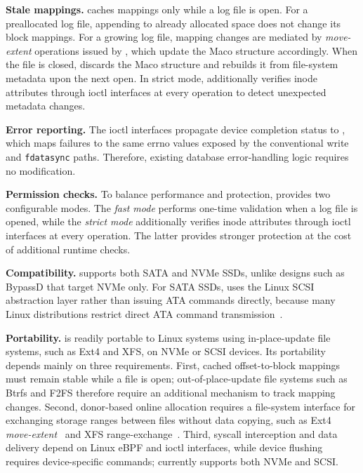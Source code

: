 \textbf{Stale mappings.}
\odes caches mappings only while a log file is open. For a preallocated log
file, appending to already allocated space does not change its block
mappings. For a growing log file, mapping changes are mediated by
\emph{move-extent} operations issued by \odes, which update the Maco
structure accordingly. When the file is closed, \odes discards the Maco
structure and rebuilds it from file-system metadata upon the next open.
In strict mode, \odes additionally verifies inode attributes through ioctl
interfaces at every operation to detect unexpected metadata changes.

\textbf{Error reporting.}
The ioctl interfaces propagate device completion status to \odes, which maps
failures to the same errno values exposed by the conventional write and
\texttt{fdatasync} paths. Therefore, existing database error-handling logic
requires no modification.

\textbf{Permission checks.}
To balance performance and protection, \odes provides two configurable
modes. The \emph{fast mode} performs one-time validation when a log file is
opened, while the \emph{strict mode} additionally verifies inode attributes
through ioctl interfaces at every operation. The latter provides stronger
protection at the cost of additional runtime checks.

\textbf{Compatibility.}
\odes supports both SATA and NVMe SSDs, unlike designs such as BypassD that
target NVMe only. For SATA SSDs, \odes uses the Linux SCSI abstraction layer
rather than issuing ATA commands directly, because many Linux distributions
restrict direct ATA command transmission~\cite{libATADe51:online}.

\textbf{Portability.}
\odes is readily portable to Linux systems using in-place-update file
systems, such as Ext4 and XFS, on NVMe or SCSI devices. Its portability
depends mainly on three requirements. First, cached offset-to-block mappings
must remain stable while a file is open; out-of-place-update file systems
such as Btrfs and F2FS therefore require an additional mechanism to track
mapping changes. Second, donor-based online allocation requires a
file-system interface for exchanging storage ranges between files without
data copying, such as Ext4 \emph{move-extent}~\cite{ext4moveextent} and XFS
range-exchange~\cite{xfs-exchange-range}. Third, syscall interception and
data delivery depend on Linux eBPF and ioctl interfaces, while device
flushing requires device-specific commands; \odes currently supports both
NVMe and SCSI.

